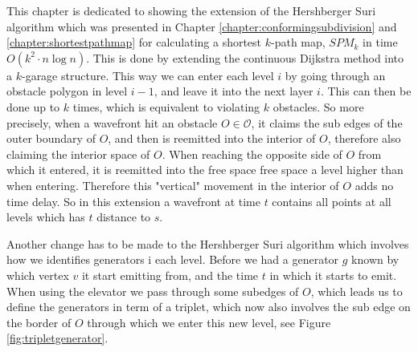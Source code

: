 \label{chapter:shortestpathobstaclesviolation}

This chapter is dedicated to showing the extension of the Hershberger Suri
algorithm which was presented in Chapter \ref{chapter:conformingsubdivision}
and \ref{chapter:shortestpathmap} for calculating a shortest $k$-path map,
$SPM_k$ in time $O(k^2 \cdot n \log n)$. This is done by extending the
continuous Dijkstra method into a $k$-garage structure. This way we can enter
each level $i$ by going through an obstacle polygon in level $i-1$, and leave
it into the next layer $i$. This can then be done up to $k$ times, which is
equivalent to violating $k$ obstacles. So more precisely, when a wavefront hit
an obstacle $O \in \mathcal{O}$, it claims the sub edges of the outer boundary
of $O$, and then is reemitted into the interior of $O$, therefore also
claiming the interior space of $O$. When reaching the opposite side of $O$ from
which it entered, it is reemitted into the free space free space a level
higher than when entering. Therefore this "vertical" movement in the interior
of $O$ adds no time delay. So in this extension a wavefront at time $t$
contains all points at all levels which has $t$ distance to $s$. 

Another change has to be made to the Hershberger Suri algorithm which involves
how we identifies generators i each level. Before we had a generator $g$ known
by which vertex $v$ it start emitting from, and the time $t$ in which it starts
to emit. When using the elevator we pass through some subedges of $O$, which
leads us to define the generators in term of a triplet, which now also involves
the sub edge on the border of $O$ through which we enter this new level, see
Figure \ref{fig:tripletgenerator}.

